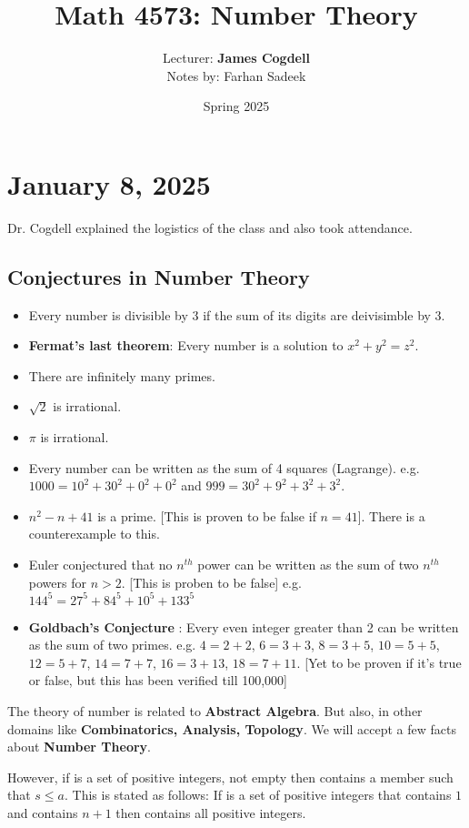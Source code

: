 \documentclass[11pt]{article}
\title{Math 4573: Number Theory}
\author{Lecturer: \textbf{James Cogdell}\\Notes by: Farhan Sadeek}
\date{Spring 2025}
\begin{document}
\maketitle

\section{January 8, 2025}

Dr. Cogdell explained the logistics of the class and also took attendance.
\subsection{Conjectures in Number Theory}
\begin{itemize}
    \item Every number is divisible by 3 if the sum of its digits are deivisimble by 3.
    \item \textbf{Fermat's last theorem}: Every number is a solution to $x^2 + y^2 = z^2$.
    \item There are infinitely many primes.
    \item $\sqrt{2}$ is irrational.
    \item $\pi$ is irrational.
    \item Every number can be written as the sum of 4 squares (Lagrange). e.g. $1000 = 10
              ^2 + 30^2 +0^2 + 0^2$ and $999 = 30^2 + 9^2 + 3^2 + 3^2$.
    \item $n^2 - n + 41$ is a prime. [This is proven to be false if $n = 41$]. There is a counterexample to this.
    \item Euler conjectured that no $n^{th}$ power can be written as the sum of two
          $n^{th}$ powers for $n > 2$. [This is proben to be false] e.g. $144^5 = 27^5 +
              84^5 + 10 ^5 + 133^5$
    \item \textbf{Goldbach's Conjecture} : Every even integer greater than 2 can be written as the sum of two primes. e.g. $4 = 2 + 2$, $6 = 3 + 3$, $8 = 3 + 5$, $10 = 5 + 5$, $12 = 5 + 7$, $14 = 7 + 7$, $16 = 3 + 13$, $18 = 7 + 11$. [Yet to be proven if it's true or false, but this has been verified till 100,000]
\end{itemize}
The theory of number is related to \textbf{Abstract Algebra}. But also, in other domains like \textbf{Combinatorics, Analysis, Topology}. We will accept a few facts about \textbf{Number Theory}.
\\
\begin{fact}
    However, if \SS is a set of positive integers, not empty then \SS contains a member such that $s \leq a$. This is stated as follows:
    If \SS is a set of positive integers that contains $1$ and contains $n + 1$ then \SS contains all positive integers.
\end{fact}
\end{document}
